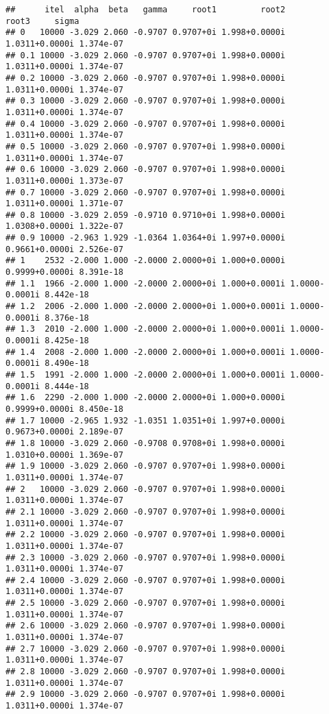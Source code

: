 \documentclass[
  12pt,
]{article}
\begin{document}
\begin{verbatim}
##      itel  alpha  beta   gamma     root1         root2          root3     sigma
## 0   10000 -3.029 2.060 -0.9707 0.9707+0i 1.998+0.0000i 1.0311+0.0000i 1.374e-07
## 0.1 10000 -3.029 2.060 -0.9707 0.9707+0i 1.998+0.0000i 1.0311+0.0000i 1.374e-07
## 0.2 10000 -3.029 2.060 -0.9707 0.9707+0i 1.998+0.0000i 1.0311+0.0000i 1.374e-07
## 0.3 10000 -3.029 2.060 -0.9707 0.9707+0i 1.998+0.0000i 1.0311+0.0000i 1.374e-07
## 0.4 10000 -3.029 2.060 -0.9707 0.9707+0i 1.998+0.0000i 1.0311+0.0000i 1.374e-07
## 0.5 10000 -3.029 2.060 -0.9707 0.9707+0i 1.998+0.0000i 1.0311+0.0000i 1.374e-07
## 0.6 10000 -3.029 2.060 -0.9707 0.9707+0i 1.998+0.0000i 1.0311+0.0000i 1.373e-07
## 0.7 10000 -3.029 2.060 -0.9707 0.9707+0i 1.998+0.0000i 1.0311+0.0000i 1.371e-07
## 0.8 10000 -3.029 2.059 -0.9710 0.9710+0i 1.998+0.0000i 1.0308+0.0000i 1.322e-07
## 0.9 10000 -2.963 1.929 -1.0364 1.0364+0i 1.997+0.0000i 0.9661+0.0000i 2.526e-07
## 1    2532 -2.000 1.000 -2.0000 2.0000+0i 1.000+0.0000i 0.9999+0.0000i 8.391e-18
## 1.1  1966 -2.000 1.000 -2.0000 2.0000+0i 1.000+0.0001i 1.0000-0.0001i 8.442e-18
## 1.2  2006 -2.000 1.000 -2.0000 2.0000+0i 1.000+0.0001i 1.0000-0.0001i 8.376e-18
## 1.3  2010 -2.000 1.000 -2.0000 2.0000+0i 1.000+0.0001i 1.0000-0.0001i 8.425e-18
## 1.4  2008 -2.000 1.000 -2.0000 2.0000+0i 1.000+0.0001i 1.0000-0.0001i 8.490e-18
## 1.5  1991 -2.000 1.000 -2.0000 2.0000+0i 1.000+0.0001i 1.0000-0.0001i 8.444e-18
## 1.6  2290 -2.000 1.000 -2.0000 2.0000+0i 1.000+0.0000i 0.9999+0.0000i 8.450e-18
## 1.7 10000 -2.965 1.932 -1.0351 1.0351+0i 1.997+0.0000i 0.9673+0.0000i 2.189e-07
## 1.8 10000 -3.029 2.060 -0.9708 0.9708+0i 1.998+0.0000i 1.0310+0.0000i 1.369e-07
## 1.9 10000 -3.029 2.060 -0.9707 0.9707+0i 1.998+0.0000i 1.0311+0.0000i 1.374e-07
## 2   10000 -3.029 2.060 -0.9707 0.9707+0i 1.998+0.0000i 1.0311+0.0000i 1.374e-07
## 2.1 10000 -3.029 2.060 -0.9707 0.9707+0i 1.998+0.0000i 1.0311+0.0000i 1.374e-07
## 2.2 10000 -3.029 2.060 -0.9707 0.9707+0i 1.998+0.0000i 1.0311+0.0000i 1.374e-07
## 2.3 10000 -3.029 2.060 -0.9707 0.9707+0i 1.998+0.0000i 1.0311+0.0000i 1.374e-07
## 2.4 10000 -3.029 2.060 -0.9707 0.9707+0i 1.998+0.0000i 1.0311+0.0000i 1.374e-07
## 2.5 10000 -3.029 2.060 -0.9707 0.9707+0i 1.998+0.0000i 1.0311+0.0000i 1.374e-07
## 2.6 10000 -3.029 2.060 -0.9707 0.9707+0i 1.998+0.0000i 1.0311+0.0000i 1.374e-07
## 2.7 10000 -3.029 2.060 -0.9707 0.9707+0i 1.998+0.0000i 1.0311+0.0000i 1.374e-07
## 2.8 10000 -3.029 2.060 -0.9707 0.9707+0i 1.998+0.0000i 1.0311+0.0000i 1.374e-07
## 2.9 10000 -3.029 2.060 -0.9707 0.9707+0i 1.998+0.0000i 1.0311+0.0000i 1.374e-07

\end{verbatim}
\end{document}
